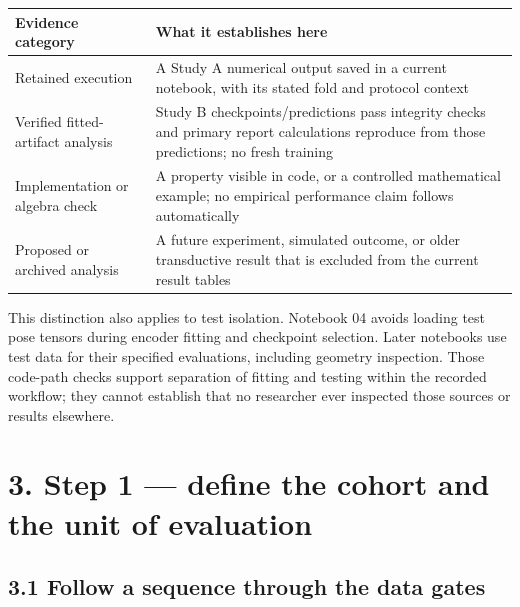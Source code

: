 \documentclass[11pt,letterpaper]{article}
\newcounter{none}
\begin{document}
\begin{minipage}{\linewidth}

{\def\LTcaptype{none} %
\begin{longtable}[]{@{}
  >{\raggedright\arraybackslash}p{}
  >{\raggedright\arraybackslash}p{}@{}}
\toprule\noalign{}
\begin{minipage}[b]{\linewidth}\raggedright
Evidence category
\end{minipage} & \begin{minipage}[b]{\linewidth}\raggedright
What it establishes here
\end{minipage} \\
\midrule\noalign{}
\endhead
\bottomrule\noalign{}
\endlastfoot
Retained execution & A Study A numerical output saved in a current
notebook, with its stated fold and protocol context \\
Verified fitted-artifact analysis & Study B checkpoints/predictions pass
integrity checks and primary report calculations reproduce from those
predictions; no fresh training \\
Implementation or algebra check & A property visible in code, or a
controlled mathematical example; no empirical performance claim follows
automatically \\
Proposed or archived analysis & A future experiment, simulated outcome,
or older transductive result that is excluded from the current result
tables \\
\end{longtable}
}

\end{minipage}

This distinction also applies to test isolation. Notebook 04 avoids
loading test pose tensors during encoder fitting and checkpoint
selection. Later notebooks use test data for their specified
evaluations, including geometry inspection. Those code-path checks
support separation of fitting and testing within the recorded workflow;
they cannot establish that no researcher ever inspected those sources or
results elsewhere.

\section{3. Step 1 --- define the cohort and the unit of
evaluation}\label{step-1-define-the-cohort-and-the-unit-of-evaluation}

\subsection{3.1 Follow a sequence through the data
gates}\label{follow-a-sequence-through-the-data-gates}
\end{document}
